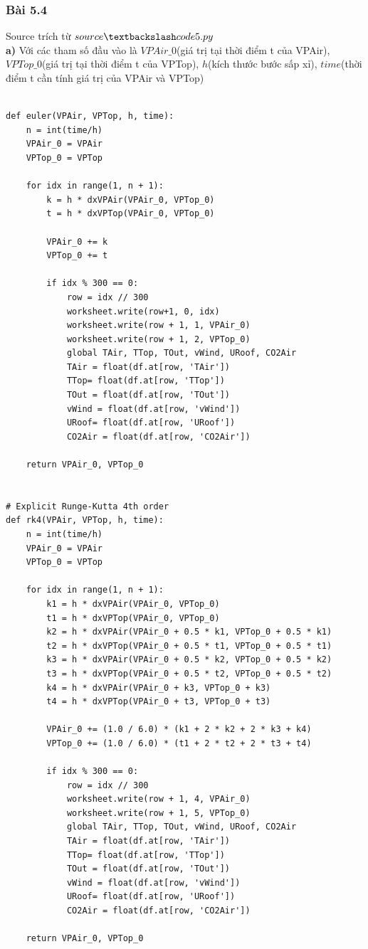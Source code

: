 \documentclass[a4paper]{article}
\begin{document}
\subsubsection{Bài 5.4}
Source trích từ $source\textbackslash code5.py$\\
\textbf{a)}
Với các tham số đầu vào là $VPAir\_0$(giá trị tại thời điểm t của VPAir), $VPTop\_0$(giá trị tại thời điểm t của VPTop), $h$(kích thước bước sấp xỉ), $time$(thời điểm t cần tính giá trị của VPAir và VPTop)
\begin{verbatim}
  
def euler(VPAir, VPTop, h, time):
    n = int(time/h)
    VPAir_0 = VPAir
    VPTop_0 = VPTop

    for idx in range(1, n + 1):
        k = h * dxVPAir(VPAir_0, VPTop_0)
        t = h * dxVPTop(VPAir_0, VPTop_0)

        VPAir_0 += k
        VPTop_0 += t

        if idx % 300 == 0:
            row = idx // 300
            worksheet.write(row+1, 0, idx)
            worksheet.write(row + 1, 1, VPAir_0)
            worksheet.write(row + 1, 2, VPTop_0)
            global TAir, TTop, TOut, vWind, URoof, CO2Air
            TAir = float(df.at[row, 'TAir'])
            TTop= float(df.at[row, 'TTop'])
            TOut = float(df.at[row, 'TOut'])
            vWind = float(df.at[row, 'vWind'])
            URoof= float(df.at[row, 'URoof'])
            CO2Air = float(df.at[row, 'CO2Air'])

    return VPAir_0, VPTop_0


# Explicit Runge-Kutta 4th order
def rk4(VPAir, VPTop, h, time):
    n = int(time/h)
    VPAir_0 = VPAir
    VPTop_0 = VPTop

    for idx in range(1, n + 1):
        k1 = h * dxVPAir(VPAir_0, VPTop_0)
        t1 = h * dxVPTop(VPAir_0, VPTop_0)
        k2 = h * dxVPAir(VPAir_0 + 0.5 * k1, VPTop_0 + 0.5 * k1)
        t2 = h * dxVPTop(VPAir_0 + 0.5 * t1, VPTop_0 + 0.5 * t1)
        k3 = h * dxVPAir(VPAir_0 + 0.5 * k2, VPTop_0 + 0.5 * k2)
        t3 = h * dxVPTop(VPAir_0 + 0.5 * t2, VPTop_0 + 0.5 * t2)
        k4 = h * dxVPAir(VPAir_0 + k3, VPTop_0 + k3)
        t4 = h * dxVPTop(VPAir_0 + t3, VPTop_0 + t3)

        VPAir_0 += (1.0 / 6.0) * (k1 + 2 * k2 + 2 * k3 + k4)
        VPTop_0 += (1.0 / 6.0) * (t1 + 2 * t2 + 2 * t3 + t4)

        if idx % 300 == 0:
            row = idx // 300
            worksheet.write(row + 1, 4, VPAir_0)
            worksheet.write(row + 1, 5, VPTop_0)
            global TAir, TTop, TOut, vWind, URoof, CO2Air
            TAir = float(df.at[row, 'TAir'])
            TTop= float(df.at[row, 'TTop'])
            TOut = float(df.at[row, 'TOut'])
            vWind = float(df.at[row, 'vWind'])
            URoof= float(df.at[row, 'URoof'])
            CO2Air = float(df.at[row, 'CO2Air'])

    return VPAir_0, VPTop_0
\end{verbatim}
\end{document}
